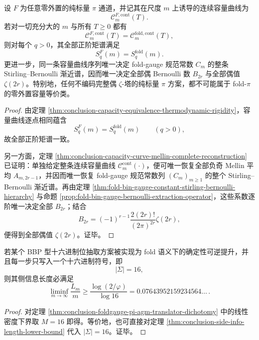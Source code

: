 \begin{theorem}\label{thm:conclusion-foldgauge-pi-zero-external-capacity-bernoulli-completeness}
设 \(F\) 为任意零外置的纯标量 \(\pi\) 通道，并记其在尺度 \(m\) 上诱导的连续容量曲线为
\[
\mathcal C_m^{F,\mathrm{cont}}(T).
\]
若对一切充分大的 \(m\) 与所有 \(T\ge 0\) 都有
\[
\mathcal C_m^{F,\mathrm{cont}}(T)
=
\mathcal C_m^{\mathrm{fold},\mathrm{cont}}(T),
\]
则对每个 \(q>0\)，其全部正阶矩谱满足
\[
S_q^F(m)=S_q^{\mathrm{fold}}(m).
\]
更进一步，同一条容量曲线序列唯一决定 fold-gauge 规范常数 \(C_m\) 的整条 Stirling--Bernoulli 渐近谱，因而唯一决定全部偶 Bernoulli 数 \(B_{2r}\) 与全部偶值 \(\zeta(2r)\)。特别地，任何不编码完整偶 \(\zeta\)-塔的纯标量 \(\pi\) 方案，都不可能属于 fold-\(\pi\) 的零外置容量等价类。
\end{theorem}
\begin{proof}
由定理 \ref{thm:conclusion-capacity-equivalence-thermodynamic-rigidity}，容量曲线逐点相同蕴含
\[
S_q^F(m)=S_q^{\mathrm{fold}}(m)
\qquad(q>0),
\]
故全部正阶矩谱一致。

另一方面，定理 \ref{thm:conclusion-capacity-curve-mellin-complete-reconstruction} 已证明：单独给定整条连续容量曲线 \(\mathcal C_m^{\mathrm{cont}}(\cdot)\)，便可唯一恢复全部负奇 Mellin 平均 \(A_{m,2r-1}\)，并因而唯一恢复 fold-gauge 规范常数列 \((C_m)_{m\ge 1}\) 的整个 Stirling--Bernoulli 渐近谱。再由定理 \ref{thm:fold-bin-gauge-constant-stirling-bernoulli-hierarchy} 与命题 \ref{prop:fold-bin-gauge-bernoulli-extraction-operator}，这些系数逐阶唯一决定全部 \(B_{2r}\)；结合
\[
B_{2r}=(-1)^{r-1}\frac{2(2r)!}{(2\pi)^{2r}}\zeta(2r),
\]
便得到全部偶值 \(\zeta(2r)\)。证毕。
\end{proof}

\begin{proposition}\label{prop:conclusion-foldgauge-pi-bbp-hex-address-rate}
若某个 BBP 型十六进制位抽取方案被实现为 fold 语义下的确定性可逆提升，并且每一步只写入一个十六进制符号，即
\[
|\Sigma|=16,
\]
则其侧信息长度必满足
\[
\liminf_{m\to\infty}\frac{L_m}{m}
\ge
\frac{\log(2/\varphi)}{\log 16}
=
0.07643952159234564\ldots\,.
\]
\end{proposition}
\begin{proof}
对定理 \ref{thm:conclusion-foldgauge-pi-agm-translator-dichotomy} 中的线性密度下界取 \(M=16\) 即得。等价地，也可直接对定理 \ref{thm:conclusion-side-info-length-lower-bound} 代入 \(|\Sigma|=16\)。证毕。
\end{proof}

\endinput
